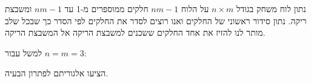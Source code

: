 \begin{example}
נתון לוח משחק בגודל 
$n \times m$
על הלוח 
$nm - 1$
חלקים ממוספרים מ-1 עד 
$nm - 1$
ומשבצת ריקה.
נתון סידור ראשוני של החלקים ואנו רוצים לסדר את החלקים לפי הסדר 
כך שבכל שלב מותר לנו להזיז את אחד החלקים ששכנים למשבצת הריקה אל המשבצת הריקה.
\end{example}
למשל עבור
$n = m = 3$:
\begin{center}
\end{center}


הציעו אלגוריתם לפתרון הבעיה.
